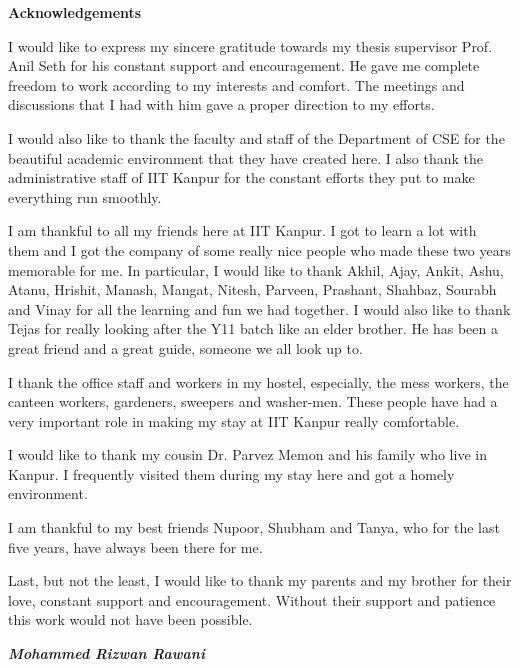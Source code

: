 \begin{center}
	{\huge{\textbf{Acknowledgements}}}
\end{center}

I would like to express my sincere gratitude towards my thesis supervisor Prof. Anil Seth for his constant support and encouragement. He gave me complete freedom to work according to my interests and comfort. The meetings and discussions that I had with him gave a proper direction to my efforts.

I would also like to thank the faculty and staff of the Department of CSE for the beautiful academic environment that they have created here. I also thank the administrative staff of IIT Kanpur for the constant efforts they put to make everything run smoothly.

I am thankful to all my friends here at IIT Kanpur. I got to learn a lot with them and I got the company of some really nice people who made these two years memorable for me. In particular, I would like to thank Akhil, Ajay, Ankit, Ashu, Atanu, Hrishit, Manash, Mangat, Nitesh, Parveen, Prashant, Shahbaz, Sourabh and Vinay for all the learning and fun we had together. I would also like to thank Tejas for really looking after the Y11 batch like an elder brother. He has been a great friend and a great guide, someone we all look up to.

I thank the office staff and workers in my hostel, especially, the mess workers, the canteen workers, gardeners, sweepers and washer-men. These people have had a very important role in making my stay at IIT Kanpur really comfortable.

I would like to thank my cousin Dr. Parvez Memon and his family who live in Kanpur. I frequently visited them during my stay here and got a homely environment.

I am thankful to my best friends Nupoor, Shubham and Tanya, who for the last five years, have always been there for me.

Last, but not the least, I would like to thank my parents and my brother for their love, constant support and encouragement. Without their support and patience this work would not have been possible.

\vskip 4mm
\begin{flushright}
\textit{\textbf{Mohammed Rizwan Rawani}}
\end{flushright}
